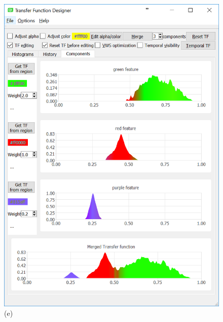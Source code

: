 \documentclass[twoside,twocolumn,10pt]{article}
\begin{document}
\begin{figure}
\begin{minipage}{.16\textwidth}
		\includegraphics[width=1\linewidth]{tf_vortex_merged_segment_blend_green_red_purple}
		(e)
	\end{minipage}~
	\begin{minipage}{.16\textwidth}
		\centering

\end{minipage}
\end{figure}
\end{document}
